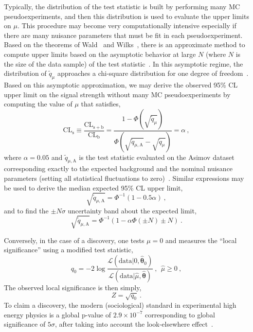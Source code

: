 Typically, the distribution of the test statistic is built by
performing many MC pseudoexperiments, and then this distribution is used to
evaluate the upper limits on $\mu$. This procedure may become very
computationally intensive especially if there are many nuisance
parameters that must be fit in each pseudoexperiment. Based on the
theorems of Wald~\cite{Wald} and Wilks~\cite{Wilks:1938dza}, there is an approximate method to
compute upper limits based on the asymptotic behavior at large $N$
(where $N$ is the size of the data sample) of the test
statistic~\cite{Cowan:2010js}. In this asymptotic regime, the
distribution of $\tilde q_{\mu}$ approaches a chi-square distribution
for one degree of freedom~\cite{Wilks:1938dza}. Based on this asymptotic approximation, we
may derive the observed 95\% CL upper limit on the signal strength
without many MC pseudoexperiments by computing the value of $\mu$ that satisfies,
\begin{equation}
\mathrm{CL}_{\mathrm{s}}\equiv
\frac{\mathrm{CL}_{\mathrm{s+b}}}{\mathrm{CL}_{\mathrm{b}}} = 
\frac{1-\Phi(\sqrt{\tilde
    q_{\mu}})}{\Phi(\sqrt{\tilde q_{\mu,\mathrm{A}}} - \sqrt{\tilde
    q_{\mu}} ) } = \alpha ~,
\end{equation}
where $\alpha = 0.05$ and $\tilde q_{\mu,\mathrm{A}}$ is the test statistic evaluated on
the Asimov dataset~\cite{Asimov} corresponding exactly to the expected
background and the nominal nuisance parameters (setting all
statistical fluctuations to zero)~\cite{Cowan:2010js,LHCCLs}. Similar
expressions may be used to derive the median expected 95\% CL upper limit, 
\begin{equation}
\sqrt{\tilde q_{\mu,\mathrm{A}}} = \Phi^{-1}(1-0.5\alpha) ~,
\end{equation}
and to find the $\pm N\sigma$ uncertainty band about the expected limit,
\begin{equation}
\sqrt{\tilde q_{\mu,\mathrm{A}}} = \Phi^{-1}(1-\alpha\Phi(\pm N)\pm N)~.
\end{equation}

Conversely, in the case of a discovery, one tests $\mu=0$ and measures
the ``local significance'' using a modified test statistic,
\begin{equation}
q_{0} = -2\log\frac{\mathcal
  L(\mathrm{data}|0,\boldsymbol{\hat\theta}_{0})}{\mathcal
  L(\mathrm{data}|\hat\mu, \boldsymbol{\hat\theta})} ~, ~~ \hat\mu\geq 0~,
\end{equation}
The observed local significance is then simply,
\begin{equation}
Z = \sqrt{q_0}~.
\end{equation}
To claim a discovery, the modern (sociological) standard in experimental high energy
physics is a global p-value of $2.9\times10^{-7}$ corresponding to global
significance of $5\sigma$, after taking into account the
look-elsewhere effect~\cite{Lyons:2013yja,Cousins:2013hry,Gross:2010qma}.

